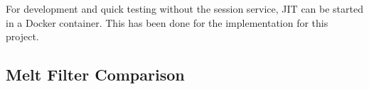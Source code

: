 \documentclass[../MasterThesis.tex]{subfiles}
\begin{document}
For development and quick testing without the session service, JIT can be started in a Docker container. This has been done for the implementation for this project.




%
%
%
%
%
%
%
%
%
%
%
%
%
%
%





\newpage
\subsection{Melt Filter Comparison} \label{subsection:meltfilter}
\end{document}
